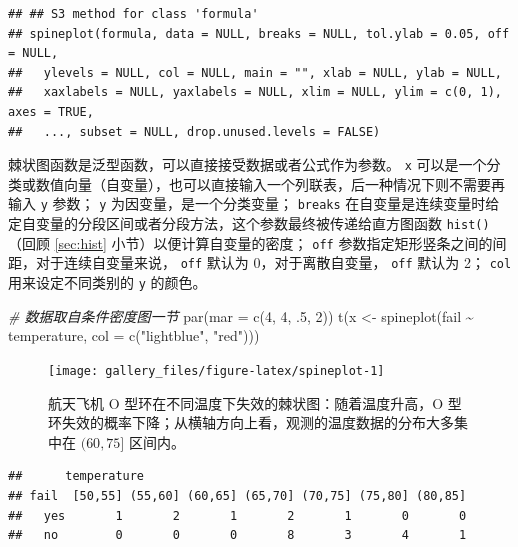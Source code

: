 \documentclass[
  b5paper,
  UTF8,twoside]{book}
\newenvironment{Shaded}{\begin{snugshade}}{\end{snugshade}}
\newcommand{\AttributeTok}[1]{\textcolor[rgb]{0.77,0.63,0.00}{#1}}
\newcommand{\CommentTok}[1]{\textcolor[rgb]{0.56,0.35,0.01}{\textit{#1}}}
\newcommand{\DecValTok}[1]{\textcolor[rgb]{0.00,0.00,0.81}{#1}}
\newcommand{\FunctionTok}[1]{\textcolor[rgb]{0.00,0.00,0.00}{#1}}
\newcommand{\NormalTok}[1]{#1}
\newcommand{\OtherTok}[1]{\textcolor[rgb]{0.56,0.35,0.01}{#1}}
\newcommand{\SpecialCharTok}[1]{\textcolor[rgb]{0.00,0.00,0.00}{#1}}
\newcommand{\StringTok}[1]{\textcolor[rgb]{0.31,0.60,0.02}{#1}}
\begin{document}
\begin{verbatim}
## ## S3 method for class 'formula'
## spineplot(formula, data = NULL, breaks = NULL, tol.ylab = 0.05, off = NULL,
##   ylevels = NULL, col = NULL, main = "", xlab = NULL, ylab = NULL,
##   xaxlabels = NULL, yaxlabels = NULL, xlim = NULL, ylim = c(0, 1), axes = TRUE,
##   ..., subset = NULL, drop.unused.levels = FALSE)
\end{verbatim}

棘状图函数是泛型函数，可以直接接受数据或者公式作为参数。 \texttt{x} 可以是一个分类或数值向量（自变量），也可以直接输入一个列联表，后一种情况下则不需要再输入 \texttt{y} 参数； \texttt{y} 为因变量，是一个分类变量； \texttt{breaks} 在自变量是连续变量时给定自变量的分段区间或者分段方法，这个参数最终被传递给直方图函数 \texttt{hist()} （回顾 \ref{sec:hist} 小节）以便计算自变量的密度； \texttt{off} 参数指定矩形竖条之间的间距，对于连续自变量来说， \texttt{off} 默认为 0，对于离散自变量， \texttt{off} 默认为 2； \texttt{col} 用来设定不同类别的 \texttt{y} 的颜色。





\begin{Shaded}
\begin{Highlighting}[]
\CommentTok{\# 数据取自条件密度图一节}
\FunctionTok{par}\NormalTok{(}\AttributeTok{mar =} \FunctionTok{c}\NormalTok{(}\DecValTok{4}\NormalTok{, }\DecValTok{4}\NormalTok{, .}\DecValTok{5}\NormalTok{, }\DecValTok{2}\NormalTok{))}
\FunctionTok{t}\NormalTok{(x }\OtherTok{\textless{}{-}} \FunctionTok{spineplot}\NormalTok{(fail }\SpecialCharTok{\textasciitilde{}}\NormalTok{ temperature, }\AttributeTok{col =} \FunctionTok{c}\NormalTok{(}\StringTok{"lightblue"}\NormalTok{, }\StringTok{"red"}\NormalTok{)))}
\end{Highlighting}
\end{Shaded}

\begin{figure}

{\centering \texttt{[image: gallery\_files/figure-latex/spineplot-1]} 

}

\caption[航天飞机 O 型环在不同温度下失效的棘状图]{航天飞机 O 型环在不同温度下失效的棘状图：随着温度升高，O 型环失效的概率下降；从横轴方向上看，观测的温度数据的分布大多集中在 \((60, 75]\) 区间内。}\label{fig:spineplot}
\end{figure}

\begin{verbatim}
##      temperature
## fail  [50,55] (55,60] (60,65] (65,70] (70,75] (75,80] (80,85]
##   yes       1       2       1       2       1       0       0
##   no        0       0       0       8       3       4       1
\end{verbatim}
\end{document}
